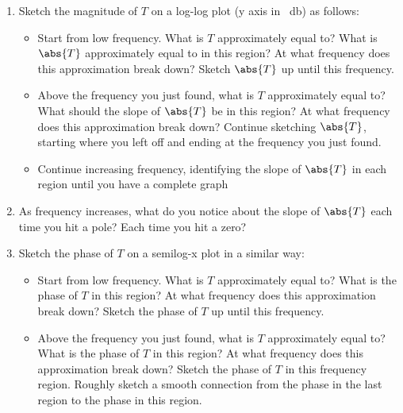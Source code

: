 \documentclass[11pt]{article}
\begin{document}
\begin{problem}
\begin{enumerate}[\alph*)]
\item

Sketch the magnitude of $T$ on a log-log plot (y axis in \SI{}{\decibel}) as follows:

\begin{itemize}

\item

Start from low frequency. What is $T$ approximately equal to? What is $\abs{T}$ approximately
equal to in this region? At what frequency does this approximation break down? Sketch
$\abs{T}$ up until this frequency.

\item

Above the frequency you just found, what is $T$ approximately equal to? What should
the slope of $\abs{T}$ be in this region? At what frequency does this approximation break
down? Continue sketching $\abs{T}$, starting where you left off and ending at the frequency
you just found.

\item

Continue increasing frequency, identifying the slope of $\abs{T}$ in each region until you have
a complete graph

\end{itemize}

\item

As frequency increases, what do you notice about the slope of $\abs{T}$ each time you hit a pole?
Each time you hit a zero?

\item

Sketch the phase of $T$ on a semilog-x plot in a similar way:

\begin{itemize}

\item

Start from low frequency. What is $T$ approximately equal to? What is the phase of $T$ in
this region? At what frequency does this approximation break down? Sketch the phase
of $T$ up until this frequency.

\item

Above the frequency you just found, what is $T$ approximately equal to? What is the
phase of $T$ in this region? At what frequency does this approximation break down?
Sketch the phase of $T$ in this frequency region. Roughly sketch a smooth connection
from the phase in the last region to the phase in this region.


\end{itemize}
\end{enumerate}
\end{problem}
\end{document}

